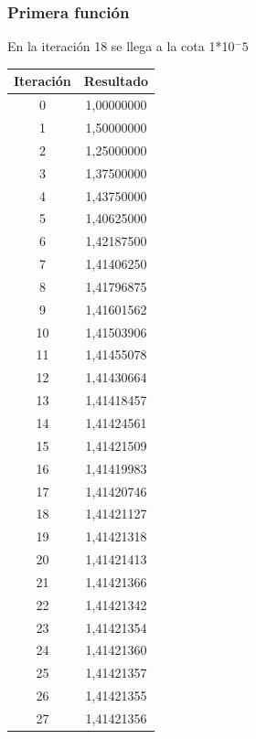 \documentclass[titlepage,a4paper]{article}
\begin{document}
\subsubsection{Primera función}\label{sec:bis1}

En la iteración 18 se llega a la cota 1*10$^-5$

\begin{center}
    \begin{tabular}{| c | c |}
    \hline
        Iteración & Resultado \\ \hline
        0     & 1,00000000 \\
        1     & 1,50000000 \\
        2     & 1,25000000 \\
        3     & 1,37500000 \\
        4     & 1,43750000 \\
        5     & 1,40625000 \\
        6     & 1,42187500 \\
        7     & 1,41406250 \\
        8     & 1,41796875 \\
        9     & 1,41601562 \\
        10    & 1,41503906 \\
        11    & 1,41455078 \\
        12    & 1,41430664 \\
        13    & 1,41418457 \\
        14    & 1,41424561 \\
        15    & 1,41421509 \\
        16    & 1,41419983 \\
        17    & 1,41420746 \\
        18    & 1,41421127 \\
        19    & 1,41421318 \\
        20    & 1,41421413 \\
        21    & 1,41421366 \\
        22    & 1,41421342 \\
        23    & 1,41421354 \\
        24    & 1,41421360 \\
        25    & 1,41421357 \\
        26    & 1,41421355 \\
        27    & 1,41421356 \\ \hline
    \end{tabular}
\end{center}
\end{document}
